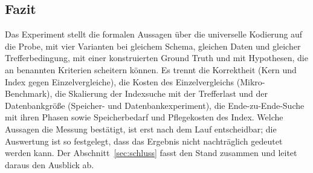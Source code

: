 \subsection{Fazit}
\label{sec:ucx_fazit}

Das Experiment stellt die formalen Aussagen über die universelle Kodierung auf die Probe, mit vier Varianten bei gleichem Schema, gleichen Daten und gleicher Trefferbedingung, mit einer konstruierten Ground Truth und mit Hypothesen, die an benannten Kriterien scheitern können. Es trennt die Korrektheit (Kern und Index gegen Einzelvergleiche), die Kosten des Einzelvergleichs (Mikro-Benchmark), die Skalierung der Indexsuche mit der Trefferlast und der Datenbankgröße (Speicher- und Datenbankexperiment), die Ende-zu-Ende-Suche mit ihren Phasen sowie Speicherbedarf und Pflegekosten des Index. Welche Aussagen die Messung bestätigt, ist erst nach dem Lauf entscheidbar; die Auswertung ist so festgelegt, dass das Ergebnis nicht nachträglich gedeutet werden kann. Der Abschnitt~\ref{sec:schluss} fasst den Stand zusammen und leitet daraus den Ausblick ab.
